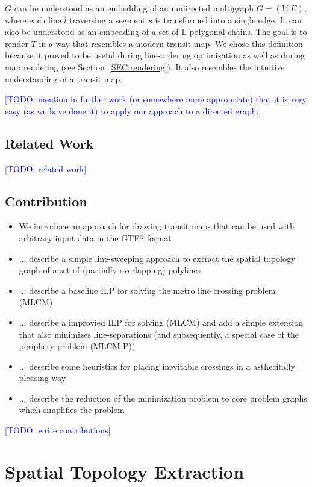 \documentclass{llncs}
\newcommand\todo[1]{\textcolor{blue}{[TODO: #1]}}
\begin{document}
$G$ can be understood as an embedding of an undirected multigraph $G = (V, E)$, where each line $l$ traversing a segment $s$ is transformed into a single edge. It can also be understood as an embedding of a set of $\mathbb{L}$ polygonal chains.
The goal is to render $T$ in a way that resembles a modern transit map.
We chose this definition because it proved to be useful during line-ordering optimization as well as during map rendering (see Section~\ref{SEC:rendering}). It also resembles the intuitive understanding of a transit map.

\todo{mention in further work (or somewhere more appropriate) that it is very easy (as we have done it) to apply our approach to a directed graph.}

%
\subsection{Related Work}\label{SEC:related}
%
\todo{related work}

%
\subsection{Contribution}\label{SEC:contrib}
%
\begin{itemize}
	\item We introduce an approach for drawing transit maps that can be used with arbitrary input data in the GTFS format
	\item ... describe a simple line-sweeping approach to extract the spatial topology graph of a set of (partially overlapping) polylines
	\item ... describe a baseline ILP for solving the metro line crossing problem (MLCM)
	\item ... describe a improvied ILP for solving (MLCM) and add a simple extension that also minimizes line-separations (and subsequently, a special case of the periphery problem (MLCM-P))
	\item ... describe some heuristics for placing inevitable crossings in a asthecitally pleasing way
	\item ... describe the reduction of the minimization problem to core problem graphs which simplifies the problem
\end{itemize}

\todo{write contributions}

%
\section{Spatial Topology Extraction}\label{SEC:topo}
%
\end{document}
